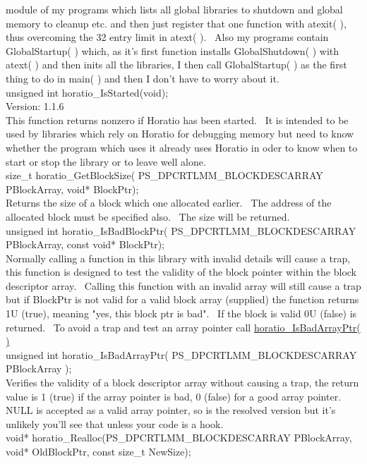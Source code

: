 \documentclass{article}
\begin{document}
module
of my programs which lists all global libraries to shutdown and global
memory to cleanup etc. and then just register that one function with
atexit(
), thus overcoming the 32 entry limit in atext( ).~ Also my
programs
contain GlobalStartup( ) which, as it's first function installs
GlobalShutdown(
) with atext( ) and then inits all the libraries, I then call
GlobalStartup(
) as the first thing to do in main( ) and then I don't have to worry
about
it.
\\
unsigned int horatio\_IsStarted(void);
\\
Version: 1.1.6
\\
This function returns nonzero if Horatio has been started.~ It
is intended to be used by libraries which rely on Horatio for
debugging
memory but need to know whether the program which uses it already uses
Horatio in oder to know when to start or stop the library or to leave
well alone.
\\
size\_t horatio\_GetBlockSize(
PS\_DPCRTLMM\_BLOCKDESCARRAY
PBlockArray, void* BlockPtr);
\\
Returns the size of a block which one allocated earlier.~ The
address of the allocated block must be specified also.~ The size
will
be returned.
\\
unsigned int horatio\_IsBadBlockPtr(
PS\_DPCRTLMM\_BLOCKDESCARRAY
PBlockArray, const void* BlockPtr);
\\
Normally calling a function in this library with invalid details will
cause a trap, this function is designed to test the validity of the
block
pointer within the block descriptor array.~ Calling this function
with an invalid array will still cause a trap but if BlockPtr is not
valid
for a valid block array (supplied) the function returns 1U (true),
meaning
"yes, this block ptr is bad".~ If the block is valid 0U (false) is
returned.~ To avoid a trap and test an array pointer call \href{#IsBadArrayPtr}{horatio\_IsBadArrayPtr(
)}
\\
unsigned int horatio\_IsBadArrayPtr(
PS\_DPCRTLMM\_BLOCKDESCARRAY
PBlockArray );
\\
Verifies the validity of a block descriptor array without causing a
trap, the return value is 1 (true) if the array pointer is bad, 0
(false)
for a good array pointer.~ NULL is accepted as a valid array
pointer,
so is the resolved version but it's unlikely you'll see that unless
your
code is a hook.
\\
void* horatio\_Realloc(PS\_DPCRTLMM\_BLOCKDESCARRAY
PBlockArray, void* OldBlockPtr, const size\_t NewSize);
\\
\end{document}
